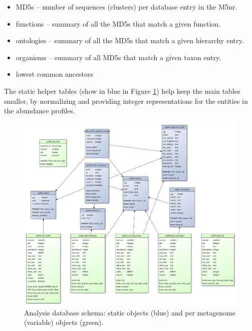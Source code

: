 \documentclass[12pt,fullpage]{report}
\begin{document}
\begin{itemize}
\item MD5s --
number of sequences (clusters) per database entry in the M5nr.

\item functions --
summary of all the MD5s that match a given function.

\item ontologies --
summary of all the MD5s that match a given hierarchy entry.

\item organisms --
summary of all MD5s that match a given taxon entry.

\item lowest common ancestors


\end{itemize}

The static helper tables (show in blue in Figure \ref{fig:mgrast_analysis-schema}) help
keep the main tables smaller, by normalizing and providing integer representations for the entities in the abundance profiles.


\begin{figure}
\begin{center}
\includegraphics[width=6in]{Images/mgrast_analysis-schema.png}
\end{center}
\caption{
Analysis database schema: static objects (blue) and per metagenome (variable) objects (green).
}
\label{fig:mgrast_analysis-schema}
\end{figure}
\end{document}

